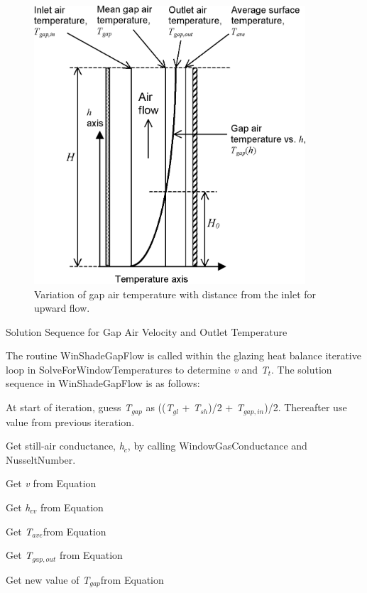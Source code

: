 \begin{figure}[hbtp] %
\centering
\includegraphics[width=0.9\textwidth, height=0.9\textheight, keepaspectratio=true]{media/image1687.png}
\caption{  Variation of gap air temperature with distance from the inlet for upward flow. \protect \label{fig:variation-of-gap-air-temperature-with}}
\end{figure}

Solution Sequence for Gap Air Velocity and Outlet Temperature

The routine WinShadeGapFlow is called within the glazing heat balance iterative loop in SolveForWindowTemperatures to determine \emph{v} and \emph{T\(_{t}\)}. The solution sequence in WinShadeGapFlow is as follows:

At start of iteration, guess \emph{T\(_{gap}\)} as ((\emph{T\(_{gl}\)} + \emph{T\(_{sh}\)})/2 + \emph{T\(_{gap,in}\)})/2. Thereafter use value from previous iteration.

Get still-air conductance, \emph{h\(_{c}\)}, by calling WindowGasConductance and NusseltNumber.

Get \emph{v} from Equation

Get \emph{h\(_{cv}\)} from Equation

Get \emph{T\(_{ave}\)}from Equation

Get \emph{T\(_{gap,out}\)} from Equation

Get new value of \emph{T\(_{gap}\)}from Equation

